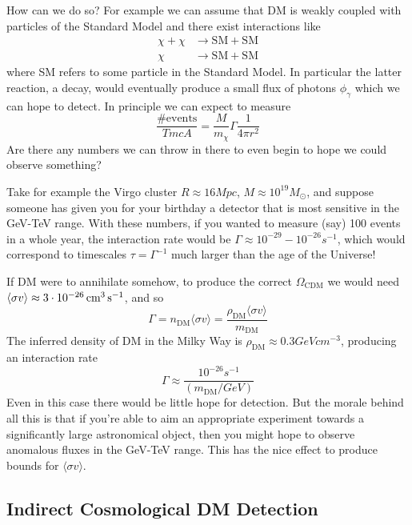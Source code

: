 How can we do so? For example we can assume that DM is weakly coupled with particles of the Standard Model and there exist interactions like 
\begin{align*}
    \chi + \chi &\to \text{SM} + \text{SM} \\
    \chi &\to \text{SM} + \text{SM}
\end{align*}
where SM refers to some particle in the Standard Model. In particular the latter reaction, a decay, would eventually produce a small flux of photons $\phi_{\gamma}$ which we can hope to detect. In principle we can expect to measure 
\begin{equation}
    \frac{\text{\# events}}{T mc A} = \frac{M}{m_{\chi}}\Gamma\frac{1}{4\pi r^{2}}
\end{equation}
Are there any numbers we can throw in there to even begin to hope we could observe something?
\par Take for example the Virgo cluster $R \approx 16\unit{Mpc}$, $M\approx 10^{19}M_{\odot}$, and suppose someone has given you for your birthday a detector that is most sensitive in the GeV-TeV range. With these numbers, if you wanted to measure (say) 100 events in a whole year, the interaction rate would be $\Gamma \approx 10^{-29}-10^{-26}\unit{s}^{-1}$, which would correspond to timescales $\tau = \Gamma^{-1}$ much larger than the age of the Universe!
\par If DM were to annihilate somehow, to produce the correct $\Omega_{\text{CDM}}$ we would need $\langle \sigma v \rangle \approx 3\cdot 10^{-26}\,\text{cm}^{3}\,\text{s}^{-1}$, and so 
\begin{equation}
    \Gamma = n_{\text{DM}}\langle \sigma v \rangle = \frac{\rho_{\text{DM}}\langle \sigma v \rangle}{m_{\text{DM}}}
\end{equation}
The inferred density of DM in the Milky Way is $\rho_{\text{DM}} \approx 0.3\unit{GeV}\unit{cm}^{-3}$, producing an interaction rate
\begin{equation}
    \Gamma \approx \frac{10^{-26}\unit{s}^{-1}}{\left(m_{\text{DM}}/\unit{GeV}\right)}
\end{equation}
Even in this case there would be little hope for detection. But the morale behind all this is that if you're able to aim an appropriate experiment towards a significantly large astronomical object, then you might hope to observe anomalous fluxes in the GeV-TeV range. This has the nice effect to produce bounds for $\langle \sigma v \rangle$.

\subsection{Indirect Cosmological DM Detection}


